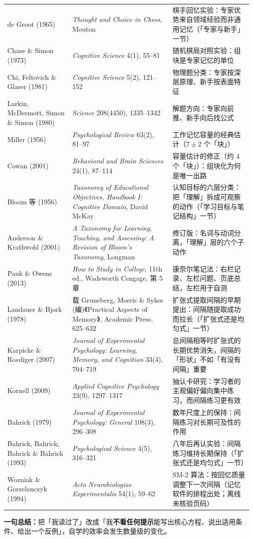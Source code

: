 {\begin{longtable}{@{}p{4.4cm}p{5.2cm}p{5.2cm}@{}}
de Groot (1965) & \textit{Thought and Choice in Chess}, Mouton & 棋手回忆实验：专家优势来自领域经验而非通用记忆（「专家与新手」一节） \\
Chase \& Simon (1973) & \textit{Cognitive Science} 4(1), 55--81 & 随机棋局对照实验：组块是专家记忆的单位 \\
Chi, Feltovich \& Glaser (1981) & \textit{Cognitive Science} 5(2), 121--152 & 物理题分类：专家按深层原理、新手按表面特征 \\
Larkin, McDermott, Simon \& Simon (1980) & \textit{Science} 208(4450), 1335--1342 & 解题方向：专家向前推、新手向后找公式 \\
Miller (1956) & \textit{Psychological Review} 63(2), 81--97 & 工作记忆容量的经典估计（$7\pm2$ 个「块」） \\
Cowan (2001) & \textit{Behavioral and Brain Sciences} 24(1), 87--114 & 容量估计的修正（约 4 个「块」）：组块化为何是唯一出路 \\
Bloom 等 (1956) & \textit{Taxonomy of Educational Objectives, Handbook I: Cognitive Domain}, David McKay & 认知目标的六层分类：把「理解」拆成可观察的动作（「学习目标与笔记结构」一节） \\
Anderson \& Krathwohl (2001) & \textit{A Taxonomy for Learning, Teaching, and Assessing: A Revision of Bloom's Taxonomy}, Longman & 修订版：名词与动词分离，「理解」层的六个子动作 \\
Pauk \& Owens (2013) & \textit{How to Study in College}, 11th ed., Wadsworth Cengage, 第 5 章 & 康奈尔笔记法：右栏记录、左栏问题、页底总结，左栏用于自测 \\
Landauer \& Bjork (1978) & 载 Gruneberg, Morris \& Sykes (编)《Practical Aspects of Memory》, Academic Press, 625--632 & 扩张式提取间隔的早期提出：间隔随提取成功而拉长（「扩张式还是均匀式」一节） \\
Karpicke \& Roediger (2007) & \textit{Journal of Experimental Psychology: Learning, Memory, and Cognition} 33(4), 704--719 & 总间隔相等时扩张式的长期优势消失，间隔的「形状」不如「有没有间隔」重要 \\
Kornell (2009) & \textit{Applied Cognitive Psychology} 23(9), 1297--1317 & 抽认卡研究：学习者的主观偏好偏向集中练习，而间隔练习更有效 \\
Bahrick (1979) & \textit{Journal of Experimental Psychology: General} 108(3), 296--308 & 数年尺度上的保持：间隔练习对长期可及性的作用 \\
Bahrick, Bahrick, Bahrick \& Bahrick (1993) & \textit{Psychological Science} 4(5), 316--321 & 八年后再认实验：间隔练习维持长期保持（「扩张式还是均匀式」一节） \\
Wozniak \& Gorzelanczyk (1994) & \textit{Acta Neurobiologiae Experimentalis} 54(1), 59--62 & SM-2 算法：按回忆质量调整下一次间隔（记忆软件的排程出处；离线未核验页码） \\
\end{longtable}
}
\normalsize

\textbf{一句总结：}把「我读过了」改成「我\textbf{不看任何提示}能写出核心方程、说出适用条件、给出一个反例」，自学的效率会发生数量级的变化。
